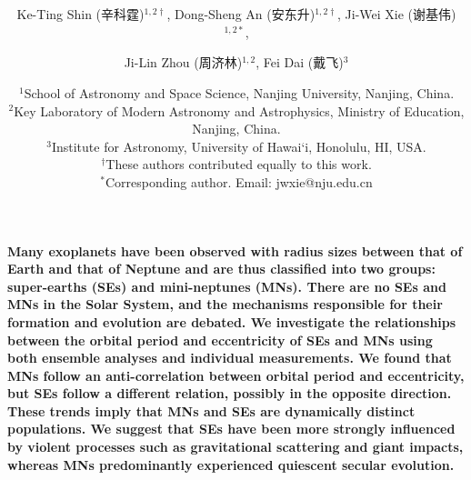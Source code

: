 \documentclass[10pt]{article}
\date{}
\title{\bfseries \boldmath \scititle}
\author{

	Ke-Ting Shin (辛科霆)$^{1,2\dagger}$,
	Dong-Sheng An (安东升)$^{1,2\dagger}$,
	Ji-Wei Xie (谢基伟)$^{1,2\ast}$,\and
        Ji-Lin Zhou (周济林)$^{1,2}$,
        Fei Dai (戴飞)$^{3}$\and


	\small$^{1}$School of Astronomy and Space Science, Nanjing University, Nanjing, China.\\
	\small$^{2}$Key Laboratory of Modern Astronomy and Astrophysics, Ministry of Education, Nanjing, China.\\
        \small$^{3}$Institute for Astronomy, University of Hawai`i, Honolulu, HI, USA.\\

    \small$^\dagger$These authors contributed equally to this work.\\
	\small$^\ast$Corresponding author. Email: jwxie@nju.edu.cn

}
\renewenvironment{abstract}
	{\quotation}
	{\endquotation}
\begin{document}
\maketitle





\begin{abstract} \fontsize{13pt}{15pt} \selectfont \bfseries \boldmath
Many exoplanets have been observed with radius sizes between that of Earth and that of Neptune and are thus classified into two groups: super-earths (SEs) and mini-neptunes (MNs).
There are no SEs and MNs in the Solar System, and the mechanisms responsible for their formation and evolution are debated.
We investigate the relationships between the orbital period and eccentricity of SEs and MNs using both ensemble analyses and individual measurements.
We found that MNs follow an anti-correlation between orbital period and eccentricity, but SEs follow a different relation, possibly in the opposite direction.
These trends imply that MNs and SEs are dynamically distinct populations.
We suggest that SEs have been more strongly influenced by violent processes such as gravitational scattering and giant impacts, whereas MNs predominantly experienced quiescent secular evolution.
\end{abstract}
\end{document}
